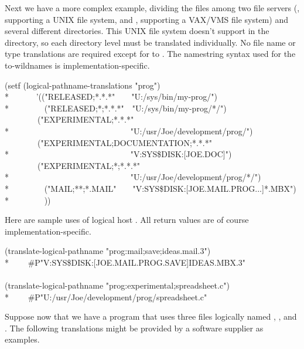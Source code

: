   Next we have a more complex example, dividing the files among two file servers
  (, supporting a UNIX file system, and , supporting a VAX/VMS file system)
  and several different directories.  This UNIX file system doesn't support
   in the directory, so each directory level must
  be translated individually.  No file name or type translations
  are required except for  to .
  The namestring syntax used for the to-wildnames is implementation-specific.
\begin{lisp}
(setf (logical-pathname-translations "prog") \\*
~~~~~~'(("RELEASED;*.*.*"~~~~"U:/sys/bin/my-prog/") \\*
~~~~~~~~("RELEASED;*;*.*.*"~~"U:/sys/bin/my-prog/*/") \\
~~~~~~~~("EXPERIMENTAL;*.*.*" \\*
~~~~~~~~~~~~~~~~~~~~~~~~~~~~~"U:/usr/Joe/development/prog/") \\
~~~~~~~~("EXPERIMENTAL;DOCUMENTATION;*.*.*" \\*
~~~~~~~~~~~~~~~~~~~~~~~~~~~~~"V:SYS\$DISK:[JOE.DOC]") \\
~~~~~~~~("EXPERIMENTAL;*;*.*.*" \\*
~~~~~~~~~~~~~~~~~~~~~~~~~~~~~"U:/usr/Joe/development/prog/*/") \\*
~~~~~~~~("MAIL;**;*.MAIL"~~~~"V:SYS\$DISK:[JOE.MAIL.PROG...]*.MBX") \\*
~~~~~~~~))
\end{lisp}
  Here are sample uses of logical host .  All return values
  are of course implementation-specific.
\begin{lisp}
(translate-logical-pathname "prog:mail;save;ideas.mail.3") \\*
~~~\EV\ \#P"V:SYS\$DISK:[JOE.MAIL.PROG.SAVE]IDEAS.MBX.3" \\
\\
(translate-logical-pathname "prog:experimental;spreadsheet.c") \\*
~~~\EV\ \#P"U:/usr/Joe/development/prog/spreadsheet.c"
\end{lisp}

  Suppose now that we have a program that uses three files logically named ,
  , and .  The following translations might be
  provided by a software supplier as examples.

